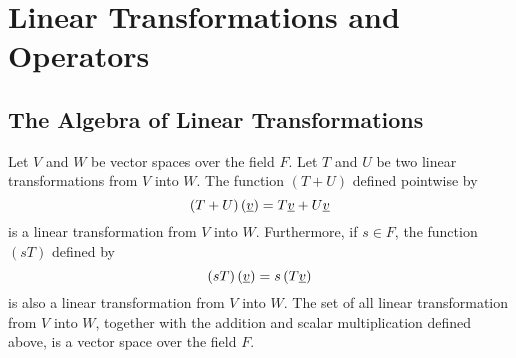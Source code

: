 \chapter{Linear Transformations and Operators}

\section{The Algebra of Linear Transformations}

\begin{theorem}
Let $V$ and $W$ be vector spaces over the field $F$.
Let $T$ and $U$ be two linear transformations from $V$ into $W$.
The function $(T+U)$ defined pointwise by
\begin{equation*}
(T + U) \left( \underline{v} \right) = T \underline{v} + U \underline{v}
\end{equation*}
is a linear transformation from $V$ into $W$.
Furthermore, if $s \in F$, the function $(sT)$ defined by
\begin{equation*}
(sT) \left( \underline{v} \right) = s \left( T \underline{v} \right)
\end{equation*}
is also a linear transformation from $V$ into $W$.
The set of all linear transformation from $V$ into $W$, together with the addition and scalar multiplication defined above, is a vector space over the field $F$.
\end{theorem}
